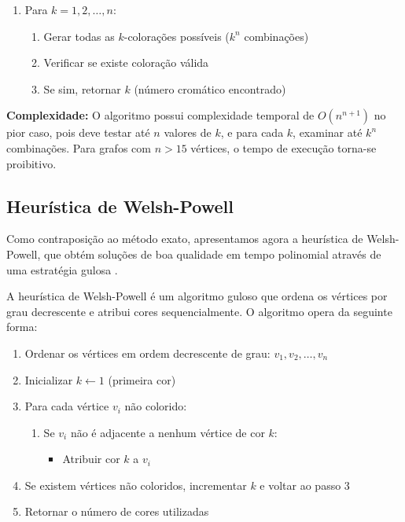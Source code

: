 \documentclass[12pt]{article}
\begin{document}
\begin{enumerate}
    \item Para $k = 1, 2, \ldots, n$:
    \begin{enumerate}
        \item Gerar todas as $k$-colorações possíveis ($k^n$ combinações)
        \item Verificar se existe coloração válida
        \item Se sim, retornar $k$ (número cromático encontrado)
    \end{enumerate}
\end{enumerate}

\textbf{Complexidade:} O algoritmo possui complexidade temporal de $O(n^{n+1})$ no pior caso, pois deve testar até $n$ valores de $k$, e para cada $k$, examinar até $k^n$ combinações. Para grafos com $n > 15$ vértices, o tempo de execução torna-se proibitivo.

\subsection{Heurística de Welsh-Powell}

Como contraposição ao método exato, apresentamos agora a heurística de Welsh-Powell, que obtém soluções de boa qualidade em tempo polinomial através de uma estratégia gulosa \cite{welsh1967upper}.

A heurística de Welsh-Powell é um algoritmo guloso que ordena os vértices por grau decrescente e atribui cores sequencialmente. O algoritmo opera da seguinte forma:

\begin{enumerate}
    \item Ordenar os vértices em ordem decrescente de grau: $v_1, v_2, \ldots, v_n$
    \item Inicializar $k \leftarrow 1$ (primeira cor)
    \item Para cada vértice $v_i$ não colorido:
    \begin{enumerate}
        \item Se $v_i$ não é adjacente a nenhum vértice de cor $k$:
        \begin{itemize}
            \item Atribuir cor $k$ a $v_i$
        \end{itemize}
    \end{enumerate}
    \item Se existem vértices não coloridos, incrementar $k$ e voltar ao passo 3
    \item Retornar o número de cores utilizadas
\end{enumerate}
\end{document}
